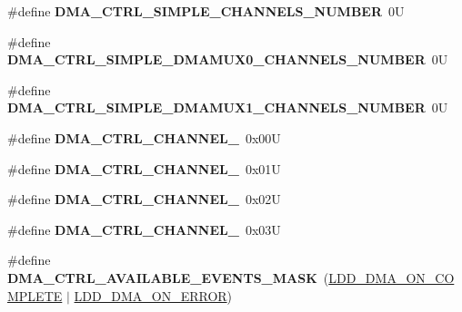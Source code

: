 \begin{DoxyCompactItemize}
\item 
\hypertarget{group___d_m_a___c_t_r_l__module_gac8ad2d692559a3feee900ff54608ce7c}{\#define {\bfseries D\-M\-A\-\_\-\-C\-T\-R\-L\-\_\-\-S\-I\-M\-P\-L\-E\-\_\-\-C\-H\-A\-N\-N\-E\-L\-S\-\_\-\-N\-U\-M\-B\-E\-R}~0\-U}\label{group___d_m_a___c_t_r_l__module_gac8ad2d692559a3feee900ff54608ce7c}

\item 
\hypertarget{group___d_m_a___c_t_r_l__module_ga22e222ca9b69ea9195755895d103930c}{\#define {\bfseries D\-M\-A\-\_\-\-C\-T\-R\-L\-\_\-\-S\-I\-M\-P\-L\-E\-\_\-\-D\-M\-A\-M\-U\-X0\-\_\-\-C\-H\-A\-N\-N\-E\-L\-S\-\_\-\-N\-U\-M\-B\-E\-R}~0\-U}\label{group___d_m_a___c_t_r_l__module_ga22e222ca9b69ea9195755895d103930c}

\item 
\hypertarget{group___d_m_a___c_t_r_l__module_ga1957669cb9909efeff019bbc8e29fd3b}{\#define {\bfseries D\-M\-A\-\_\-\-C\-T\-R\-L\-\_\-\-S\-I\-M\-P\-L\-E\-\_\-\-D\-M\-A\-M\-U\-X1\-\_\-\-C\-H\-A\-N\-N\-E\-L\-S\-\_\-\-N\-U\-M\-B\-E\-R}~0\-U}\label{group___d_m_a___c_t_r_l__module_ga1957669cb9909efeff019bbc8e29fd3b}

\item 
\hypertarget{group___d_m_a___c_t_r_l__module_ga8460d3fd81e7ab952fc873178bc3b66a}{\#define {\bfseries D\-M\-A\-\_\-\-C\-T\-R\-L\-\_\-\-C\-H\-A\-N\-N\-E\-L\-\_}~0x00\-U}\label{group___d_m_a___c_t_r_l__module_ga8460d3fd81e7ab952fc873178bc3b66a}

\item 
\hypertarget{group___d_m_a___c_t_r_l__module_gaf0cf826af5454211c4403b2cc69d704a}{\#define {\bfseries D\-M\-A\-\_\-\-C\-T\-R\-L\-\_\-\-C\-H\-A\-N\-N\-E\-L\-\_}~0x01\-U}\label{group___d_m_a___c_t_r_l__module_gaf0cf826af5454211c4403b2cc69d704a}

\item 
\hypertarget{group___d_m_a___c_t_r_l__module_ga448fa2e4a2d8b97cf04f583600f86718}{\#define {\bfseries D\-M\-A\-\_\-\-C\-T\-R\-L\-\_\-\-C\-H\-A\-N\-N\-E\-L\-\_}~0x02\-U}\label{group___d_m_a___c_t_r_l__module_ga448fa2e4a2d8b97cf04f583600f86718}

\item 
\hypertarget{group___d_m_a___c_t_r_l__module_gabde1018a8054a1325eaacfc3e7f1efdd}{\#define {\bfseries D\-M\-A\-\_\-\-C\-T\-R\-L\-\_\-\-C\-H\-A\-N\-N\-E\-L\-\_}~0x03\-U}\label{group___d_m_a___c_t_r_l__module_gabde1018a8054a1325eaacfc3e7f1efdd}

\item 
\hypertarget{group___d_m_a___c_t_r_l__module_ga137af9ff3cce892a11bd4bc243488af8}{\#define {\bfseries D\-M\-A\-\_\-\-C\-T\-R\-L\-\_\-\-A\-V\-A\-I\-L\-A\-B\-L\-E\-\_\-\-E\-V\-E\-N\-T\-S\-\_\-\-M\-A\-S\-K}~(\hyperlink{group___p_e___types__module_ga76328e8cbfee1cf4f59c6139fc67a64b}{L\-D\-D\-\_\-\-D\-M\-A\-\_\-\-O\-N\-\_\-\-C\-O\-M\-P\-L\-E\-T\-E} $|$ \hyperlink{group___p_e___types__module_ga17f1da97269ce52e5acfe3d8286b9192}{L\-D\-D\-\_\-\-D\-M\-A\-\_\-\-O\-N\-\_\-\-E\-R\-R\-O\-R})}\label{group___d_m_a___c_t_r_l__module_ga137af9ff3cce892a11bd4bc243488af8}


\end{DoxyCompactItemize}
